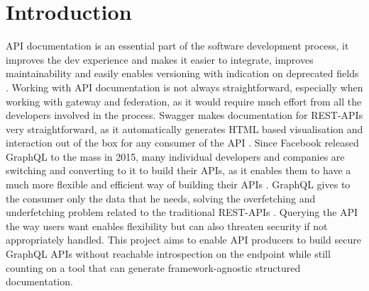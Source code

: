 \section*{Introduction}
\label{s:Introduction}
API documentation is an essential part of the software development process, it
improves the dev experience and makes it easier to integrate, improves
maintainability and easily enables versioning with indication on deprecated
fields \citep{fanWhyAPIDocumentation2021}. Working with API documentation is not
always straightforward, especially when working with gateway and federation, as
it would require much effort from all the developers involved in the process.
Swagger makes documentation for REST-APIs very straightforward, as it
automatically generates HTML based visualisation and interaction out of the box
for any consumer of the API \citep{korenExploitationOpenAPIDocumentation2018}.
Since Facebook released GraphQL to the mass in 2015, many individual developers
and companies are switching and converting to it to build their APIs, as it
enables them to have a much more flexible and efficient way of building their
APIs \citep{britoRESTVsGraphQL2020}. GraphQL gives to the consumer only the data
that he needs, solving the overfetching and underfetching problem related to the
traditional REST-APIs \citep{witternGeneratingGraphQLWrappersREST2018}. Querying
the API the way users want enables flexibility but can also threaten security if
not appropriately handled. This project aims to enable API producers to build secure
GraphQL APIs without reachable introspection on the endpoint while still
counting on a tool that can generate framework-agnostic structured documentation.



